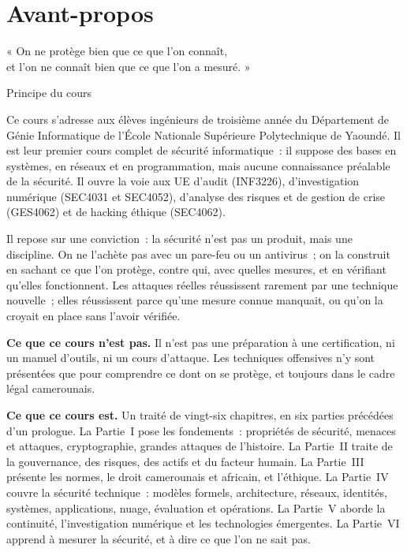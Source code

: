 
\chapter*{Avant-propos}

\epigraph{« On ne protège bien que ce que l'on connaît,\\
et l'on ne connaît bien que ce que l'on a mesuré. »}{Principe du cours}

Ce cours s'adresse aux élèves ingénieurs de troisième année du Département
de Génie Informatique de l'École Nationale Supérieure Polytechnique de
Yaoundé. Il est leur premier cours complet de sécurité informatique~: il
suppose des bases en systèmes, en réseaux et en programmation, mais aucune
connaissance préalable de la sécurité. Il ouvre la voie aux UE d'audit
(INF3226), d'investigation numérique (SEC4031 et SEC4052), d'analyse des
risques et de gestion de crise (GES4062) et de hacking éthique (SEC4062).

Il repose sur une conviction~: la sécurité n'est pas un produit, mais une
discipline. On ne l'achète pas avec un pare-feu ou un antivirus~; on la
construit en sachant ce que l'on protège, contre qui, avec quelles
mesures, et en vérifiant qu'elles fonctionnent. Les attaques réelles
réussissent rarement par une technique nouvelle~; elles réussissent parce
qu'une mesure connue manquait, ou qu'on la croyait en place sans l'avoir
vérifiée.

\bigskip

\textbf{Ce que ce cours n'est pas.} Il n'est pas une préparation à une
certification, ni un manuel d'outils, ni un cours d'attaque. Les
techniques offensives n'y sont présentées que pour comprendre ce dont on
se protège, et toujours dans le cadre légal camerounais.

\bigskip

\textbf{Ce que ce cours est.} Un traité de vingt-six chapitres, en six
parties précédées d'un prologue. La Partie~I pose les fondements~:
propriétés de sécurité, menaces et attaques, cryptographie, grandes
attaques de l'histoire. La Partie~II traite de la gouvernance, des
risques, des actifs et du facteur humain. La Partie~III présente les
normes, le droit camerounais et africain, et l'éthique. La Partie~IV
couvre la sécurité technique~: modèles formels, architecture, réseaux,
identités, systèmes, applications, nuage, évaluation et opérations. La
Partie~V aborde la continuité, l'investigation numérique et les
technologies émergentes. La Partie~VI apprend à mesurer la sécurité, et à
dire ce que l'on ne sait pas.

